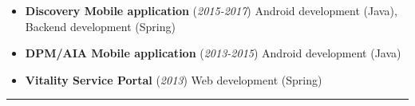 \documentclass[12pt,a4paper,sans]{moderncv}   %
\begin{document}
\begin{itemize}
\setlength\itemsep{0.5em}

\item[] \textbf{Discovery Mobile application} (\textit{2015-2017}) \newline 
Android development (Java), Backend development (Spring)
\item[] \textbf{DPM/AIA Mobile application} (\textit{2013-2015}) \newline 
Android development (Java)
\item[] \textbf{Vitality Service Portal} (\textit{2013}) \newline Web 
development (Spring)

\end{itemize}

\noindent\hfil\rule{0.5\textwidth}{.4pt}\hfil\newline

%
%

%

\end{document}
